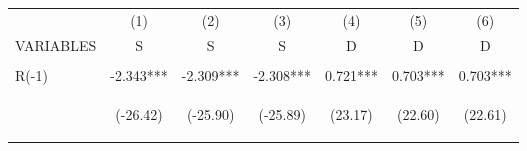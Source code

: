 \documentclass[]{article}
\begin{document}
\begin{center}
    \begin{tabular}{lcccccc} \hline
                         & (1)                                            & (2)                                            & (3)                                            & (4)                                            & (5)                                            & (6)                                            \\
        VARIABLES        & S                                              & S                                              & S                                              & D                                              & D                                              & D                                              \\ \hline
        \vspace{4pt}     & \begin{footnotesize}\end{footnotesize}         & \begin{footnotesize}\end{footnotesize}         & \begin{footnotesize}\end{footnotesize}         & \begin{footnotesize}\end{footnotesize}         & \begin{footnotesize}\end{footnotesize}         & \begin{footnotesize}\end{footnotesize}         \\
        R(-1)            & -2.343***                                      & -2.309***                                      & -2.308***                                      & 0.721***                                       & 0.703***                                       & 0.703***                                       \\
        \vspace{4pt}     & \begin{footnotesize}(-26.42)\end{footnotesize} & \begin{footnotesize}(-25.90)\end{footnotesize} & \begin{footnotesize}(-25.89)\end{footnotesize} & \begin{footnotesize}(23.17)\end{footnotesize}  & \begin{footnotesize}(22.60)\end{footnotesize}  & \begin{footnotesize}(22.61)\end{footnotesize}  \\

\end{tabular}
\end{center}
\end{document}
